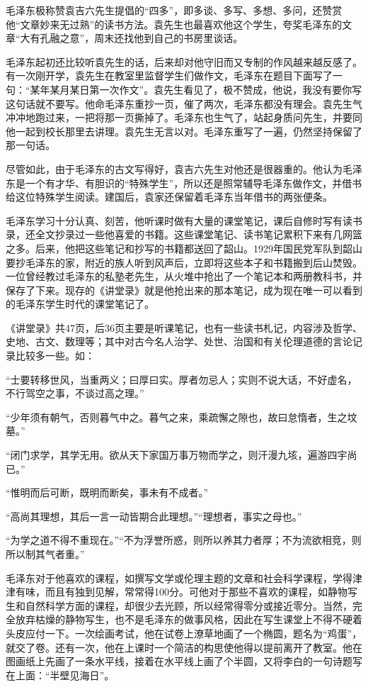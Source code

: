 \documentclass[../../dazhuan.tex]{subfiles}
\begin{document}
毛泽东极称赞袁吉六先生提倡的“四多”，即多谈、多写、多想、多问，还赞赏他“文章妙来无过熟”的读书方法。袁先生也最喜欢他这个学生，夸奖毛泽东的文章“大有孔融之意”，周末还找他到自己的书房里谈话。

毛泽东起初还比较听袁先生的话，后来却对他守旧而又专制的作风越来越反感了。有一次刚开学，袁先生在教室里监督学生们做作文，毛泽东在题目下面写了一句：“某年某月某日第一次作文”。袁先生看见了，极不赞成，他说，我没有要你写这句话就不要写。他命毛泽东重抄一页，催了两次，毛泽东都没有理会。袁先生气冲冲地跑过来，一把将那一页撕掉了。毛泽东也生气了，站起身质问先生，并要同他一起到校长那里去讲理。袁先生无言以对。毛泽东重写了一遍，仍然坚持保留了那一句话。

尽管如此，由于毛泽东的古文写得好，袁吉六先生对他还是很器重的。他认为毛泽东是一个有才华、有胆识的“特殊学生”，所以还是照常辅导毛泽东做作文，并借书给这位特殊学生阅读。建国后，袁家还保留着毛泽东当年借书的两张便条。

毛泽东学习十分认真、刻苦，他听课时做有大量的课堂笔记，课后自修时写有读书录，还全文抄录过一些他喜爱的书籍。这些课堂笔记、读书笔记累积下来有几网篮之多。后来，他把这些笔记和抄写的书籍都送回了韶山。1929年国民党军队到韶山要抄毛泽东的家，附近的族人听到风声后，立即将这些本子和书籍搬到后山焚毁。一位曾经教过毛泽东的私塾老先生，从火堆中抢出了一个笔记本和两册教科书，并保存了下来。现存的《讲堂录》就是他抢出来的那本笔记，成为现在唯一可以看到的毛泽东学生时代的课堂笔记了。

《讲堂录》共47页，后36页主要是听课笔记，也有一些读书札记，内容涉及哲学、史地、古文、数理等；其中对古今名人治学、处世、治国和有关伦理道德的言论记录比较多一些。如：

“士要转移世风，当重两义；曰厚曰实。厚者勿忌人；实则不说大话，不好虚名，不行驾空之事，不谈过高之理。”

“少年须有朝气，否则暮气中之。暮气之来，乘疏懈之隙也，故曰怠惰者，生之坟墓。”

“闭门求学，其学无用。欲从天下家国万事万物而学之，则汗漫九垓，遍游四宇尚已。”

“惟明而后可断，既明而断矣，事未有不成者。”

“高尚其理想，其后一言一动皆期合此理想。”“理想者，事实之母也。”

 “为学之道不得不重现在。”“不为浮誉所惑，则所以养其力者厚；不为流欲相竞，则所以制其气者重。”

毛泽东对于他喜欢的课程，如撰写文学或伦理主题的文章和社会科学课程，学得津津有味，而且有独到见解，常常得100分。可他对于那些不喜欢的课程，如静物写生和自然科学方面的课程，却很少去光顾，所以经常得零分或接近零分。当然，完全放弃枯燥的静物写生，也不是毛泽东的做事风格，因此在写生课堂上不得不硬着头皮应付一下。一次绘画考试，他在试卷上潦草地画了一个椭圆，题名为“鸡蛋”，就交了卷。还有一次，他在上课时一个简洁的构思使他得以提前离开了教室。他在图画纸上先画了一条水平线，接着在水平线上画了个半圆，又将李白的一句诗题写在上面：“半壁见海日”。
\end{document}
